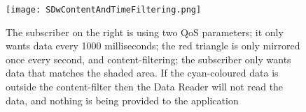 \documentclass[Main]{subfiles}
\begin{document}
\begin{figure}[H]
\centering
\texttt{[image: SDwContentAndTimeFiltering.png]}
\caption{The subscriber on the right is using two QoS parameters; 
it only wants data every 1000 milliseconds; 
the red triangle is only mirrored once every second, and content-filtering; 
the subscriber only wants data that matches the shaded area. 
If the cyan-coloured data is outside the content-filter then the Data Reader will not read the data, and nothing is being provided to the application}
\label{fig:sdwContent}
\end{figure}
\end{document}
